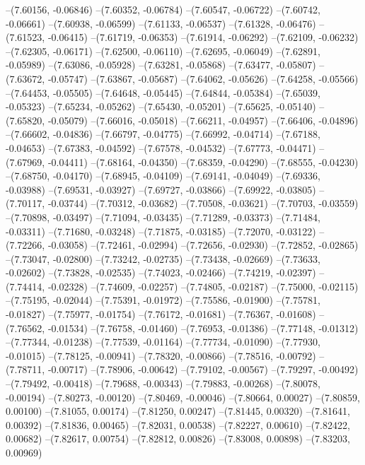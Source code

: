 --(7.60156, -0.06846)
--(7.60352, -0.06784)
--(7.60547, -0.06722)
--(7.60742, -0.06661)
--(7.60938, -0.06599)
--(7.61133, -0.06537)
--(7.61328, -0.06476)
--(7.61523, -0.06415)
--(7.61719, -0.06353)
--(7.61914, -0.06292)
--(7.62109, -0.06232)
--(7.62305, -0.06171)
--(7.62500, -0.06110)
--(7.62695, -0.06049)
--(7.62891, -0.05989)
--(7.63086, -0.05928)
--(7.63281, -0.05868)
--(7.63477, -0.05807)
--(7.63672, -0.05747)
--(7.63867, -0.05687)
--(7.64062, -0.05626)
--(7.64258, -0.05566)
--(7.64453, -0.05505)
--(7.64648, -0.05445)
--(7.64844, -0.05384)
--(7.65039, -0.05323)
--(7.65234, -0.05262)
--(7.65430, -0.05201)
--(7.65625, -0.05140)
--(7.65820, -0.05079)
--(7.66016, -0.05018)
--(7.66211, -0.04957)
--(7.66406, -0.04896)
--(7.66602, -0.04836)
--(7.66797, -0.04775)
--(7.66992, -0.04714)
--(7.67188, -0.04653)
--(7.67383, -0.04592)
--(7.67578, -0.04532)
--(7.67773, -0.04471)
--(7.67969, -0.04411)
--(7.68164, -0.04350)
--(7.68359, -0.04290)
--(7.68555, -0.04230)
--(7.68750, -0.04170)
--(7.68945, -0.04109)
--(7.69141, -0.04049)
--(7.69336, -0.03988)
--(7.69531, -0.03927)
--(7.69727, -0.03866)
--(7.69922, -0.03805)
--(7.70117, -0.03744)
--(7.70312, -0.03682)
--(7.70508, -0.03621)
--(7.70703, -0.03559)
--(7.70898, -0.03497)
--(7.71094, -0.03435)
--(7.71289, -0.03373)
--(7.71484, -0.03311)
--(7.71680, -0.03248)
--(7.71875, -0.03185)
--(7.72070, -0.03122)
--(7.72266, -0.03058)
--(7.72461, -0.02994)
--(7.72656, -0.02930)
--(7.72852, -0.02865)
--(7.73047, -0.02800)
--(7.73242, -0.02735)
--(7.73438, -0.02669)
--(7.73633, -0.02602)
--(7.73828, -0.02535)
--(7.74023, -0.02466)
--(7.74219, -0.02397)
--(7.74414, -0.02328)
--(7.74609, -0.02257)
--(7.74805, -0.02187)
--(7.75000, -0.02115)
--(7.75195, -0.02044)
--(7.75391, -0.01972)
--(7.75586, -0.01900)
--(7.75781, -0.01827)
--(7.75977, -0.01754)
--(7.76172, -0.01681)
--(7.76367, -0.01608)
--(7.76562, -0.01534)
--(7.76758, -0.01460)
--(7.76953, -0.01386)
--(7.77148, -0.01312)
--(7.77344, -0.01238)
--(7.77539, -0.01164)
--(7.77734, -0.01090)
--(7.77930, -0.01015)
--(7.78125, -0.00941)
--(7.78320, -0.00866)
--(7.78516, -0.00792)
--(7.78711, -0.00717)
--(7.78906, -0.00642)
--(7.79102, -0.00567)
--(7.79297, -0.00492)
--(7.79492, -0.00418)
--(7.79688, -0.00343)
--(7.79883, -0.00268)
--(7.80078, -0.00194)
--(7.80273, -0.00120)
--(7.80469, -0.00046)
--(7.80664, 0.00027)
--(7.80859, 0.00100)
--(7.81055, 0.00174)
--(7.81250, 0.00247)
--(7.81445, 0.00320)
--(7.81641, 0.00392)
--(7.81836, 0.00465)
--(7.82031, 0.00538)
--(7.82227, 0.00610)
--(7.82422, 0.00682)
--(7.82617, 0.00754)
--(7.82812, 0.00826)
--(7.83008, 0.00898)
--(7.83203, 0.00969)
